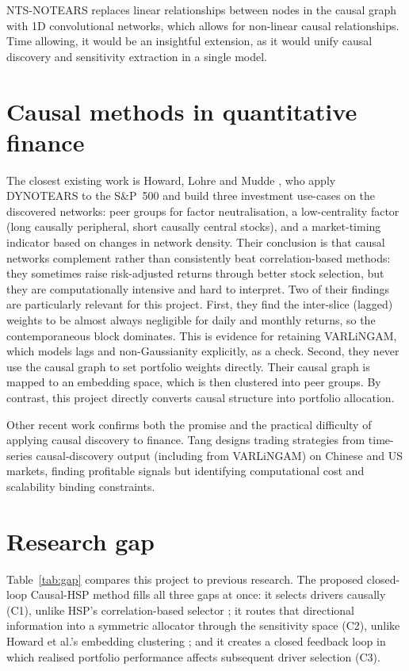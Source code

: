 \documentclass[12pt, a4paper]{report}
\begin{document}
NTS-NOTEARS \cite{sun2023ntsnotears} replaces linear relationships between nodes in the causal graph with 1D convolutional networks, which allows for non-linear causal relationships.
Time allowing, it would be an insightful extension, as it would unify causal discovery and sensitivity extraction in a single model.

\section{Causal methods in quantitative finance}
\label{sec:cd-finance}

The closest existing work is Howard, Lohre and Mudde \cite{howard2025causal}, who apply DYNOTEARS
to the S\&P~500 and build three investment use-cases on the discovered networks: 
peer groups for factor neutralisation, 
a low-centrality factor (long causally peripheral, short causally central
stocks), 
and a market-timing indicator based on changes in network density. 
Their conclusion is
that causal networks complement rather than consistently beat correlation-based methods: 
they sometimes raise risk-adjusted returns through better stock selection, but they are computationally intensive and hard to interpret. 
Two of their findings are particularly relevant for this project. 
First, they find the inter-slice (lagged)
weights to be almost always negligible for daily and monthly returns, so the contemporaneous block
dominates. 
This is evidence for retaining VARLiNGAM, which models lags and non-Gaussianity explicitly, as a check. 
Second, they never use the causal graph to set portfolio
weights directly. Their causal graph is mapped to an embedding space, which is then clustered into peer groups.
By contrast, this project directly converts causal structure into portfolio allocation.

Other recent work confirms both the promise and the practical difficulty of applying causal discovery to finance. 
Tang \cite{tang2024trading}
designs trading strategies from time-series causal-discovery output (including from VARLiNGAM) on Chinese and US markets, finding profitable signals but identifying computational cost and
scalability binding constraints. 

\section{Research gap}
\label{sec:gap}

Table~\ref{tab:gap} compares this project to previous research.
The proposed closed-loop Causal-HSP method fills all three gaps at once: it selects drivers
causally (C1), unlike HSP's correlation-based selector \cite{rodriguez2023hsp}; it routes that directional information into a symmetric allocator through the
sensitivity space (C2), unlike Howard et al.'s embedding clustering \cite{howard2025causal}; and it creates a closed feedback loop in which realised portfolio performance affects subsequent driver selection (C3).
\end{document}
